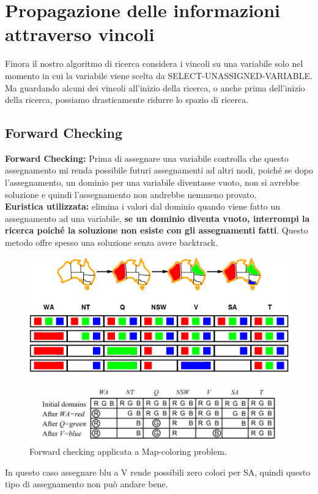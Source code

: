 \section{Propagazione delle informazioni attraverso vincoli}
Finora il nostro algoritmo di ricerca considera i vincoli su una variabile solo
nel momento in cui la variabile viene scelta da SELECT-UNASSIGNED-VARIABLE. Ma
guardando alcuni dei vincoli all'inizio della ricerca, o anche prima dell'inizio
della ricerca, possiamo drasticamente ridurre lo spazio di ricerca.
\subsection{Forward Checking}
\textbf{Forward Checking: }  Prima di assegnare una variabile controlla che
questo assegnamento mi renda possibile futuri assegnamenti ad altri nodi, poiché
se dopo l'assegnamento, un dominio per una variabile diventasse vuoto, non si
avrebbe soluzione e quindi l'assegnamento non andrebbe nemmeno provato.\\
\textbf{Euristica utilizzata:} elimina i valori dal dominio quando viene
fatto un assegnamento ad una variabile, \textbf{se un dominio diventa vuoto,
    interrompi la ricerca poiché la soluzione non esiste con gli assegnamenti
    fatti}. Questo metodo offre spesso una soluzione senza avere backtrack.
\begin{figure}[H]
    \centering
    \includegraphics[width=12cm, keepaspectratio]{img/Cap2/forwod1.png}
\end{figure}
\begin{figure}[H]
    \centering
    \includegraphics[width=11cm, keepaspectratio]{img/Cap2/f2.png}
    \caption{Forward checking applicata a Map-coloring problem.}
\end{figure}
\newpage
In questo caso assegnare blu a V rende possibili zero colori per SA, quindi
questo tipo di assegnamento non può andare bene.
